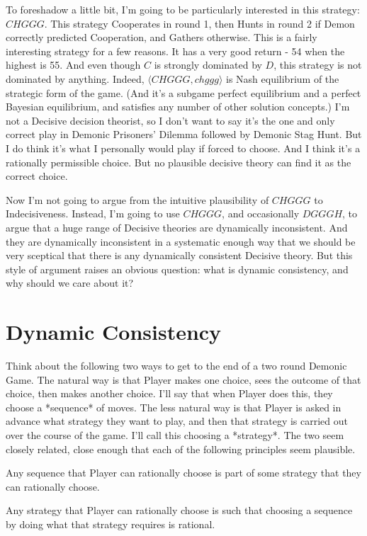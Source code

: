 \documentclass[
  12pt,
]{article}
\providecommand{\tightlist}{%
  \setlength{\itemsep}{0pt}\setlength{\parskip}{0pt}}
\begin{document}
To foreshadow a little bit, I'm going to be particularly interested in
this strategy: \(CHGGG\). This strategy Cooperates in round 1, then
Hunts in round 2 if Demon correctly predicted Cooperation, and Gathers
otherwise. This is a fairly interesting strategy for a few reasons. It
has a very good return - 54 when the highest is 55. And even though
\(C\) is strongly dominated by \(D\), this strategy is not dominated by
anything. Indeed, \(\langle CHGGG, chggg \rangle\) is Nash equilibrium
of the strategic form of the game. (And it's a subgame perfect
equilibrium and a perfect Bayesian equilibrium, and satisfies any number
of other solution concepts.) I'm not a Decisive decision theorist, so I
don't want to say it's the one and only correct play in Demonic
Prisoners' Dilemma followed by Demonic Stag Hunt. But I do think it's
what I personally would play if forced to choose. And I think it's a
rationally permissible choice. But no plausible decisive theory can find
it as the correct choice.

Now I'm not going to argue from the intuitive plausibility of \(CHGGG\)
to Indecisiveness. Instead, I'm going to use \(CHGGG\), and occasionally
\(DGGGH\), to argue that a huge range of Decisive theories are
dynamically inconsistent. And they are dynamically inconsistent in a
systematic enough way that we should be very sceptical that there is any
dynamically consistent Decisive theory. But this style of argument
raises an obvious question: what is dynamic consistency, and why should
we care about it?

\hypertarget{dynamic-consistency}{%
\section{Dynamic Consistency}\label{dynamic-consistency}}

Think about the following two ways to get to the end of a two round
Demonic Game. The natural way is that Player makes one choice, sees the
outcome of that choice, then makes another choice. I'll say that when
Player does this, they choose a *sequence* of moves. The less natural
way is that Player is asked in advance what strategy they want to play,
and then that strategy is carried out over the course of the game. I'll
call this choosing a *strategy*. The two seem closely related, close
enough that each of the following principles seem plausible.

\begin{description}
\tightlist
\item[\textbf{Backwards Dynamic Consistency}]
Any sequence that Player can rationally choose is part of some strategy
that they can rationally choose.
\item[\textbf{Forwards Dynamic Consistency}]
Any strategy that Player can rationally choose is such that choosing a
sequence by doing what that strategy requires is rational.
\end{description}
\end{document}
